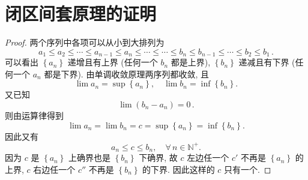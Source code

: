 \documentclass{book}
\newcommand{\Any}{\forall\,}
\newcommand{\set}[1]{\left\{#1\right\}}
\newcommand{\N}{\mathbb{N}}
\renewcommand{\le}{\leqslant}
\numberwithin{equation}{section}
\numberwithin{figure}{section}
\theoremstyle{definition}
\begin{document}
\section{闭区间套原理的证明}
\label{proof:ClosedIntervalTheorem}
\begin{proof}
  两个序列中各项可以从小到大排列为
  \begin{equation*}
    a_1\le a_2\le\cdots\le a_{n-1}\le a_n\le\cdots\le\cdots\le b_n\le b_{n-1}\le\cdots\le b_2\le b_1\,.
  \end{equation*}
  可以看出 $\set{a_n}$ 递增且有上界 (任何一个 $b_n$ 都是上界), $\set{b_n}$ 递减且有下界 (任何一个 $a_n$ 都是下界).
  由单调收敛原理两序列都收敛, 且
  \begin{equation*}
    \lim a_n=\sup\set{a_n},\quad\lim b_n=\inf\set{b_n}.
  \end{equation*}
  又已知
  \begin{equation*}
    \lim(b_n-a_n)=0\,.
  \end{equation*}
  则由运算律得到
  \begin{equation*}
    \lim a_n=\lim b_n=c=\sup\set{a_n}=\inf\set{b_n}.
  \end{equation*}
  因此又有
  \begin{equation*}
    a_n\le c\le b_n,\quad\Any n\in\N^+.
  \end{equation*}
  因为 $c$ 是 $\set{a_n}$ 上确界也是 $\set{b_n}$ 下确界, 故 $c$ 左边任一个 $c'$ 不再是 $\set{a_n}$ 的上界, $c$ 右边任一个 $c''$ 不再是 $\set{b_n}$ 的下界. 因此这样的 $c$ 只有一个.
\end{proof}
\end{document}
